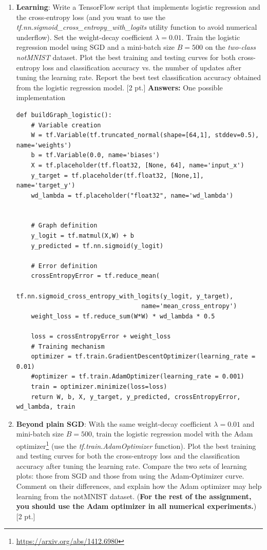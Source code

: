 \documentclass[12pt,letterpaper]{article}
\begin{document}
\begin{enumerate}
  \item \textbf{Learning}: Write a TensorFlow script that implements logistic regression and the cross-entropy loss (and you want to use the \textit{tf.nn.sigmoid\_cross\_entropy\_with\_logits} utility function to avoid numerical underflow). Set the weight-decay coefficient $\lambda = 0.01$. Train the logistic regression model using SGD and a mini-batch size $B=500$ on the \textit{two-class notMNIST} dataset. Plot the best training and testing curves for both cross-entropy loss and classification accuracy vs. the number of updates after tuning the learning rate. Report the best test classification accuracy obtained from the logistic regression model.  [2 pt.]
{\color{red}
  \textbf{Answers:}
  One possible implementation
}
\begin{verbatim}
def buildGraph_logistic():
    # Variable creation
    W = tf.Variable(tf.truncated_normal(shape=[64,1], stddev=0.5), name='weights')
    b = tf.Variable(0.0, name='biases')
    X = tf.placeholder(tf.float32, [None, 64], name='input_x')
    y_target = tf.placeholder(tf.float32, [None,1], name='target_y')
    wd_lambda = tf.placeholder("float32", name='wd_lambda')


    # Graph definition
    y_logit = tf.matmul(X,W) + b
    y_predicted = tf.nn.sigmoid(y_logit)

    # Error definition
    crossEntropyError = tf.reduce_mean(
                    tf.nn.sigmoid_cross_entropy_with_logits(y_logit, y_target), 
                                  name='mean_cross_entropy')
    weight_loss = tf.reduce_sum(W*W) * wd_lambda * 0.5

    loss = crossEntropyError + weight_loss
    # Training mechanism
    optimizer = tf.train.GradientDescentOptimizer(learning_rate = 0.01)
    #optimizer = tf.train.AdamOptimizer(learning_rate = 0.001)
    train = optimizer.minimize(loss=loss)
    return W, b, X, y_target, y_predicted, crossEntropyError, wd_lambda, train
\end{verbatim}




  \item \textbf{Beyond plain SGD}: With the same weight-decay coefficient $\lambda = 0.01$ and mini-batch size $B=500$, train the logistic regression model with the Adam optimizer\footnote{\url{https://arxiv.org/abs/1412.6980}} (use the \textit{tf.train.AdamOptimizer} function). Plot the best training and testing curves for both the cross-entropy loss and the classification accuracy after tuning the learning rate. Compare the two sets of learning plots: those from SGD and those from using the Adam-Optimizer curve. Comment on their differences, and explain how the Adam optimizer may help learning from the notMNIST dataset. (\textbf{For the rest of the assignment, you should use the Adam optimizer in all numerical experiments.}) [2 pt.]
  

\end{enumerate}
\end{document}
